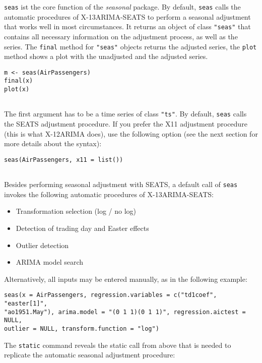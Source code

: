 \texttt{seas} ist the core function of the \emph{seasonal} package. By
default, \texttt{seas} calls the automatic procedures of X-13ARIMA-SEATS
to perform a seasonal adjustment that works well in most circumstances.
It returns an object of class \texttt{"seas"} that contains all
necessary information on the adjustment process, as well as the series.
The \texttt{final} method for \texttt{"seas"} objects returns the
adjusted series, the \texttt{plot} method shows a plot with the
unadjusted and the adjusted series.

\begin{verbatim}
m <- seas(AirPassengers)
final(x)
plot(x)
 
\end{verbatim}

The first argument has to be a time series of class \texttt{"ts"}. By
default, \texttt{seas} calls the SEATS adjustment procedure. If you
prefer the X11 adjustment procedure (this is what X-12ARIMA does), use
the following option (see the next section for more details about the
syntax):

\begin{verbatim}
seas(AirPassengers, x11 = list())
 
\end{verbatim}

Besides performing seasonal adjustment with SEATS, a default call of
\texttt{seas} invokes the following automatic procedures of
X-13ARIMA-SEATS:

\begin{itemize}
\itemsep1pt\parskip0pt
\item
  Transformation selection (log / no log)
\item
  Detection of trading day and Easter effects
\item
  Outlier detection
\item
  ARIMA model search
\end{itemize}

Alternatively, all inputs may be entered manually, as in the following
example:

\begin{verbatim}
seas(x = AirPassengers, regression.variables = c("td1coef", "easter[1]",
"ao1951.May"), arima.model = "(0 1 1)(0 1 1)", regression.aictest = NULL,
outlier = NULL, transform.function = "log")
\end{verbatim}

The \texttt{static} command reveals the static call from above that is
needed to replicate the automatic seasonal adjustment procedure:

